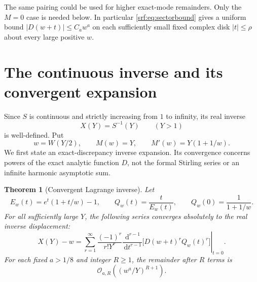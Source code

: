 \documentclass[11pt]{article}
\newtheorem{theorem}{Theorem}[section]
\theoremstyle{remark}\newtheorem{remark}[theorem]{Remark}
\newcommand{\OO}{\mathcal O}
\newcommand{\dd}{\,\mathrm d}
\begin{document}
The same pairing could be used for higher exact-mode remainders. Only the $M=0$ case is needed below. In particular \eqref{srf:eq:sectorbound} gives a uniform bound $|D(w+t)|\le C_aw^a$ on each sufficiently small fixed complex disk $|t|\le\rho$ about every large positive $w$.

\section{The continuous inverse and its convergent expansion}\label{srf:sec:inverse}
Since $S$ is continuous and strictly increasing from $1$ to infinity, its real inverse
\[
 X(Y)=S^{-1}(Y)\qquad(Y>1)
\]
is well-defined. Put
\begin{equation}\label{srf:eq:w}
 w=W(Y/2),\qquad M(w)=Y,\qquad M'(w)=Y(1+1/w).
\end{equation}
We first state an exact-discrepancy inverse expansion. Its convergence concerns powers of the exact analytic function $D$, not the formal Stirling series or an infinite harmonic asymptotic sum.

\begin{theorem}[Convergent Lagrange inverse]\label{srf:thm:inverse}
Let
\begin{equation}\label{srf:eq:EQ}
 E_w(t)=e^t(1+t/w)-1,\qquad Q_w(t)=\frac{t}{E_w(t)},
 \qquad Q_w(0)=\frac1{1+1/w}.
\end{equation}
For all sufficiently large $Y$, the following series converges absolutely to the real inverse displacement:
\begin{equation}\label{srf:eq:lagrange}
 X(Y)-w=\sum_{r=1}^\infty\frac{(-1)^r}{r!Y^r}
  \left.\frac{\dd^{r-1}}{\dd t^{r-1}}
      \bigl[D(w+t)^rQ_w(t)^r\bigr]\right|_{t=0}.
\end{equation}
For each fixed $a>1/8$ and integer $R\ge1$, the remainder after $R$ terms is
\begin{equation}\label{srf:eq:invrem}
 \OO_{a,R}\left((w^a/Y)^{R+1}\right).
\end{equation}
\end{theorem}
\end{document}
